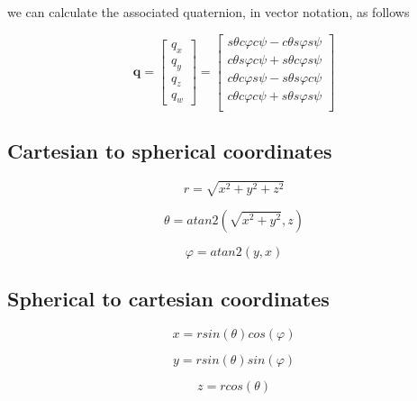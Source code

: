 we can calculate the associated quaternion, in vector notation, as follows

\[
\mathbf{q} = \begin{bmatrix} q_x \\ q_y \\ q_z \\ q_w \end{bmatrix} = \begin{bmatrix}
sθcφcψ - cθsφsψ \\
cθsφcψ + sθcφsψ \\
cθcφsψ - sθsφcψ \\
cθcφcψ + sθsφsψ \\
\end{bmatrix}
\]

\subsection{Cartesian to spherical coordinates}

\[
r = \sqrt{x^2+y^2+z^2}
\]

\[
θ = atan2(\sqrt{x^2 + y^2}, z)
\]

\[
φ = atan2(y, x)
\]


\subsection{Spherical to cartesian coordinates}

\[
x = rsin(θ)cos(φ)
\]

\[
y = rsin(θ)sin(φ)
\]

\[
z = rcos(θ)
\]

